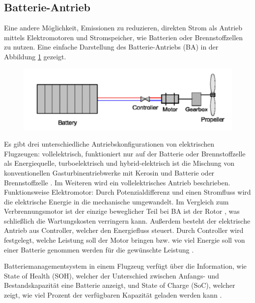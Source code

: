 \subsection{Batterie-Antrieb}
Eine andere Möglichkeit, Emissionen zu reduzieren, direkten Strom als Antrieb mittels Elektromotoren und Stromspeicher, wie Batterien oder Brennstoffzellen zu nutzen.
Eine einfache Darstellung des Batterie-Antriebs (BA) in der Abbildung \ref{ba} gezeigt.
\begin{figure}[h]
	\centering
	\includegraphics[width=0.7\linewidth]{Bilder/BA.png}
	\caption[Einfachste Batterie-Antrieb]{ \cite{hepperle2012electric}}
	\label{ba}
\end{figure}

Es gibt drei unterschiedliche Antriebskonfigurationen von elektrischen Flugzeugen: vollelektrisch, funktioniert nur auf der Batterie oder
Brennstoffzelle als Energiequelle, turboelektrisch und hybrid-elektrisch ist die Mischung von konventionellen 
Gasturbinentriebwerke mit Kerosin und Batterie oder Brennstoffzelle \cite{dahal2021techno}. %
Im Weiteren wird ein vollelektrisches Antrieb beschrieben.
%
Funktionsweise Elektromotor: Durch Potenzialdifferenz und einen Stromfluss wird die elektrische Energie in die mechanische umgewandelt.
Im Vergleich zum Verbrennungsmotor ist der einzige beweglicher Teil bei BA ist der Rotor \cite{donckers2024electric}, 
was schließlich die Wartungskosten verringern kann. Außerdem besteht der elektrische Antrieb aus Controller, welcher den Energiefluss steuert. 
Durch Controller wird festgelegt, welche Leistung soll der Motor bringen bzw. wie viel Energie soll von 
einer Batterie genommen werden für die gewünschte Leistung \cite{donckers2024electric}. 

Batteriemanagementsystem in einem Flugzeug verfügt über die Information, wie State of Health (SOH), welcher der Unterschied zwischen Anfangs-
und Bestandskapazität eine Batterie anzeigt, und State of Charge (SoC), welcher zeigt, wie viel Prozent der verfügbaren Kapazität geladen werden kann \cite{donckers2024electric}.

